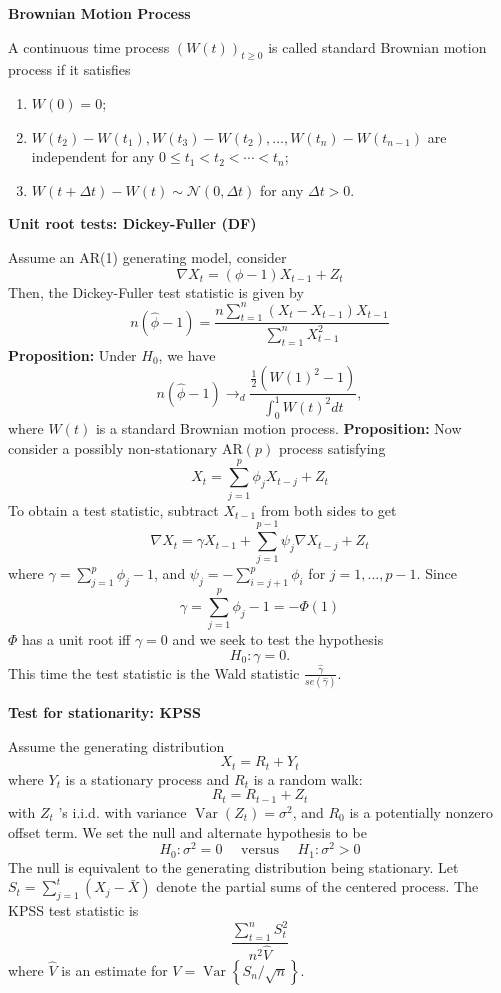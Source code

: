 \documentclass[a4paper]{article}
\newcommand{\subheading}[1]{{\scriptsize\textbf{#1}}}
\begin{document}
\begin{multicols*}{4}
\smallskip
\hline
\smallskip

\subheading{Brownian Motion Process}

A continuous time process $(W(t))_{t \geq 0}$ is called standard Brownian motion process if it satisfies
\begin{enumerate}
  \item $W(0)=0$;
  \item $W\left(t_{2}\right)-W\left(t_{1}\right), W\left(t_{3}\right)-W\left(t_{2}\right), \ldots, W\left(t_{n}\right)-W\left(t_{n-1}\right)$ are independent for any $0 \leq t_{1}<t_{2}<\cdots<t_{n}$;
  \item $W(t+\Delta t)-W(t) \sim \mathcal{N}(0, \Delta t)$ for any $\Delta t>0$.
\end{enumerate}
\hline
\smallskip

\subheading{Unit root tests: Dickey-Fuller (DF)}

Assume an AR(1) generating model, consider
$$
\nabla X_{t}=(\phi-1) X_{t-1}+Z_{t}
$$
Then, the Dickey-Fuller test statistic is given by
$$
n(\hat{\phi}-1)=\frac{n \sum_{t=1}^{n}\left(X_{t}-X_{t-1}\right) X_{t-1}}{\sum_{t=1}^{n} X_{t-1}^{2}}
$$
\textbf{Proposition:} Under $H_{0}$, we have
$$
n(\hat{\phi}-1) \rightarrow_{d} \frac{\frac{1}{2}\left(W(1)^{2}-1\right)}{\int_{0}^{1} W(t)^{2} d t},
$$
where $W(t)$ is a standard Brownian motion process.
\textbf{Proposition:}
Now consider a possibly non-stationary $\mathrm{AR}(p)$ process satisfying
$$
X_{t}=\sum_{j=1}^{p} \phi_{j} X_{t-j}+Z_{t}
$$
To obtain a test statistic, subtract $X_{t-1}$ from both sides to get
$$
\nabla X_{t}=\gamma X_{t-1}+\sum_{j=1}^{p-1} \psi_{j} \nabla X_{t-j}+Z_{t}
$$
where $\gamma=\sum_{j=1}^{p} \phi_{j}-1$, and $\psi_{j}=-\sum_{i=j+1}^{p} \phi_{i}$ for $j=1, \ldots, p-1$. Since
$$
\gamma=\sum_{j=1}^{p} \phi_{j}-1=-\Phi(1)
$$
$\Phi$ has a unit root iff $\gamma=0$ and we seek to test the hypothesis
$$
H_{0}: \gamma=0 .
$$
This time the test statistic is the Wald statistic $\frac{\hat{\gamma}}{s e(\hat{\gamma})}$.

\smallskip
\hline
\smallskip

\subheading{Test for stationarity: KPSS}

Assume the generating distribution
$$
X_{t}=R_{t}+Y_{t}
$$
where $Y_{t}$ is a stationary process and $R_{t}$ is a random walk:
$$
R_{t}=R_{t-1}+Z_{t}
$$
with $Z_{t}$ 's i.i.d. with variance $\operatorname{Var}\left(Z_{t}\right)=\sigma^{2}$, and $R_{0}$ is a potentially nonzero offset term. We set the null and alternate hypothesis to be
$$
H_{0}: \sigma^{2}=0 \quad \text { versus } \quad H_{1}: \sigma^{2}>0
$$
The null is equivalent to the generating distribution being stationary. Let $S_{t}=\sum_{j=1}^{t}\left(X_{j}-\bar{X}\right)$ denote the partial sums of the centered process. The KPSS test statistic is
$$
\frac{\sum_{t=1}^{n} S_{t}^{2}}{n^{2} \hat{V}}
$$
where $\hat{V}$ is an estimate for $V=\operatorname{Var}\left\{S_{n} / \sqrt{n}\right\}$.


\end{multicols*}
\end{document}
